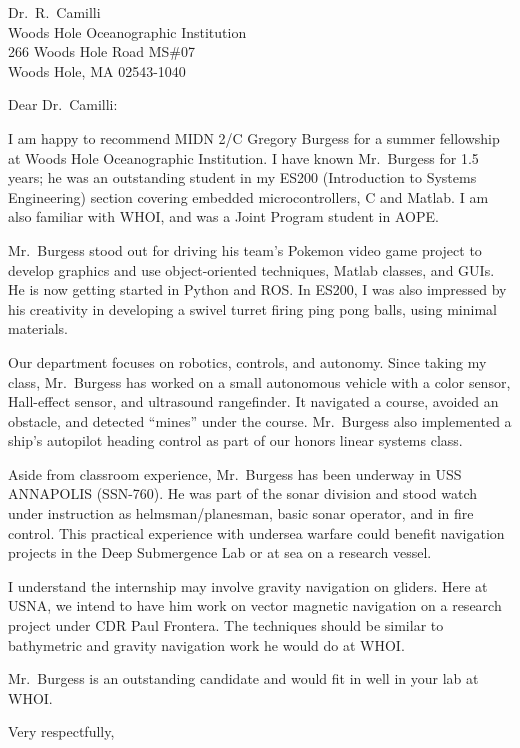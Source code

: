 \documentclass[12pt]{wrceletter}
\date{\today}
\begin{document}
\begin{letter}{%
Dr.~R.~Camilli\\
Woods Hole Oceanographic Institution\\
266 Woods Hole Road MS\#07\\
Woods Hole, MA 02543-1040}

\opening{Dear Dr.~Camilli:}

I am happy to recommend MIDN 2/C Gregory Burgess for a summer fellowship at Woods Hole Oceanographic Institution. I have known Mr.~Burgess for 1.5 years; he was an outstanding student in my ES200 (Introduction to Systems Engineering) section covering embedded microcontrollers, C and Matlab. I am also familiar with WHOI, and was a Joint Program student in AOPE. 

Mr.~Burgess stood out for driving his team's Pokemon video game project to develop graphics and use object-oriented techniques, Matlab classes, and GUIs. He is now getting started in Python and ROS. In ES200, I was also impressed by his creativity in developing a swivel turret firing ping pong balls, using minimal materials. 

Our department focuses on robotics, controls, and autonomy. Since taking my class, Mr.~Burgess has worked on a small autonomous vehicle with a color sensor, Hall-effect sensor, and ultrasound rangefinder. It navigated a course, avoided an obstacle, and detected ``mines'' under the course. Mr.~Burgess also implemented a ship's autopilot heading control as part of our honors linear systems class. 

Aside from classroom experience, Mr.~Burgess has been underway in USS ANNAPOLIS (SSN-760). He was part of the sonar division and stood watch under instruction as helmsman/planesman, basic sonar operator, and in fire control. This practical experience with undersea warfare could benefit navigation projects in the Deep Submergence Lab or at sea on a research vessel. 

I understand the internship may involve gravity navigation on gliders. Here at USNA, we intend to have him work on vector magnetic navigation on a research project under CDR Paul Frontera. The techniques should be similar to bathymetric and gravity navigation work he would do at WHOI. 

Mr.~Burgess is an outstanding candidate and would fit in well in your lab at WHOI.
\closing{Very respectfully,} %

\end{letter}
\end{document}
